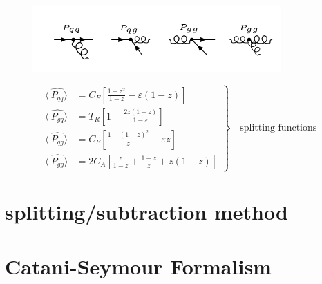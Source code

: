 \begin{figure}[h!]
\centering
\includegraphics[width=0.85\textwidth]{images/Intro/spiliting.png}
\end{figure}

\begin{equation}
	\left.\begin{aligned}
\langle\:\hat{P_{qq}}\rangle &= C_F[\frac{1+z^2}{1-z}-\varepsilon(1-z)]\\
\langle\:\hat{P_{gq}}\rangle &= T_R[1-\frac{2z(1-z)}{1-\varepsilon}]\\
\langle\:\hat{P_{qg}}\rangle &= C_F[\frac{1+(1-z)^2}{z}-\varepsilon z]\\
\langle\:\hat{P_{gg}}\rangle &= 2C_A[\frac{z}{1-z}+\frac{1-z}{z}+z(1-z)]
\end{aligned}
	\right\}
	\quad \text{splitting functions}
\end{equation}
\newpage
\section{splitting/subtraction method}

\section{Catani-Seymour Formalism}